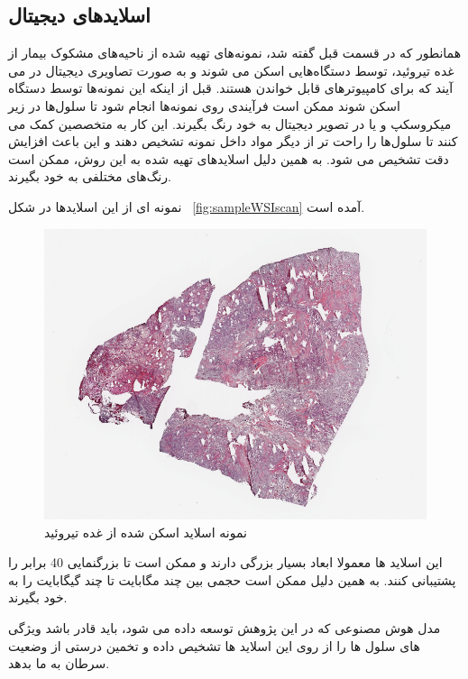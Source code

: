 \subsection{اسلاید‌های دیجیتال}\label{subsec:اسلاید-های-دیجیتال}
همانطور که در قسمت قبل گفته شد، نمونه‌های تهیه شده از ناحیه‌های مشکوک بیمار از غده تیروئید، توسط دستگاه‌هایی اسکن می شوند و به صورت تصاویری دیجیتال در می آیند که برای کامپیوتر‌های قابل خواندن هستند.
قبل از اینکه این نمونه‌ها توسط دستگاه اسکن شوند ممکن است فرآیندی روی نمونه‌ها انجام شود تا سلول‌ها در زیر میکروسکپ و یا در تصویر دیجیتال به خود رنگ بگیرند.
این کار به متخصصین کمک می کنند تا سلول‌ها را راحت تر از دیگر مواد داخل نمونه تشخیص دهند و این باعث افزایش دقت تشخیص می شود.
به همین دلیل اسلاید‌های تهیه شده به این روش، ممکن است رنگ‌های مختلفی به خود بگیرند.


نمونه ای از این اسلاید‌ها در شکل ~\autoref{fig:sampleWSIscan} آمده است.
\begin{figure}
    \begin{center}
        \includegraphics[width=\linewidth]{figs/introduction/Sample_WSI.PNG}
    \end{center}
    \caption{نمونه اسلاید اسکن شده از غده تیروئید}
    \label{fig:sampleWSIscan}
\end{figure}
این اسلاید ها معمولا ابعاد بسیار بزرگی دارند و ممکن است تا بزرگنمایی 40 برابر را پشتیبانی کنند.
به همین دلیل ممکن است حجمی بین چند مگابایت تا چند گیگابایت را به خود بگیرند.

مدل هوش مصنوعی که در این پژوهش توسعه داده می شود، باید قادر باشد ویژگی های سلول ها را از روی این اسلاید ها تشخیص داده و تخمین درستی از وضعیت سرطان به ما بدهد.